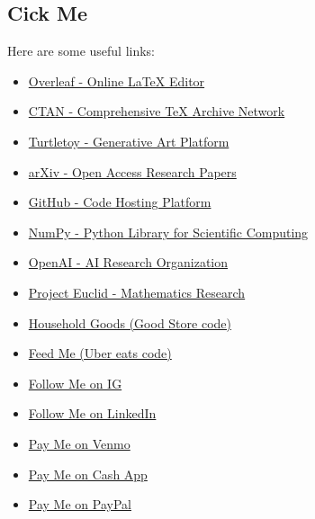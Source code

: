 \subsection{Cick Me}

Here are some useful links:

\begin{itemize}
    \item \href{https://www.overleaf.com}{Overleaf - Online LaTeX Editor}
    \item \href{https://www.ctan.org}{CTAN - Comprehensive TeX Archive Network}
    \item \href{https://turtletoy.net}{Turtletoy - Generative Art Platform}
    \item \href{https://arxiv.org}{arXiv - Open Access Research Papers}
    \item \href{https://github.com}{GitHub - Code Hosting Platform}
    \item \href{https://numpy.org}{NumPy - Python Library for Scientific Computing}
    \item \href{https://openai.com}{OpenAI - AI Research Organization}
    \item \href{https://projecteuclid.org}{Project Euclid - Mathematics Research}

    \item \href{https://oken.do/ggmh4kmj}{Household Goods (Good Store code)}
    \item \href{https://ubereats.com/feed?promoCode=eats-i81xs}{Feed Me (Uber eats code)}
    \item \href{https://www.instagram.com/chromatocosmos/}{Follow Me on IG}
    \item \href{https://www.linkedin.com/in/geoffrey-bradway/}{Follow Me on LinkedIn}
    \item \href{https://venmo.com/u/Geoffrey-Bradway}{Pay Me on Venmo}
    \item \href{https://cash.app/$Chromatocosmos}{Pay Me on Cash App}
    \item \href{paypal.me/chromatocosmos}{Pay Me on PayPal}
\end{itemize}

